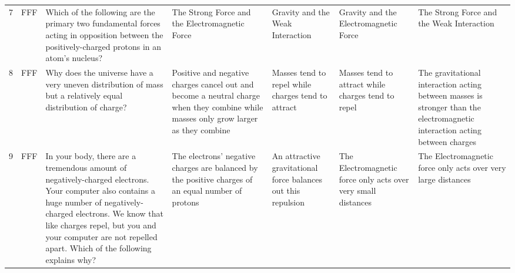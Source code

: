 \documentclass[10pt]{article}
\begin{document}
\begin{tiny}
\begin{longtable}{r P{0.3in} P{1.203in} P{0.8in} P{0.8in} P{0.8in} P{0.8in}}
    7     &     FFF &                                                                                                                                  Which of the following are the primary two fundamental forces acting in opposition between the positively-charged protons in an atom's nucleus? &                                                                                        The Strong Force and the Electromagnetic Force &                                                                      Gravity and the Weak Interaction &                                                                                      Gravity and the Electromagnetic Force &                                                                                         The Strong Force and the Weak Interaction \\
    8     &     FFF &                                                                                                                                                                     Why does the universe have a very uneven distribution of mass but a relatively equal distribution of charge? &  Positive and negative charges cancel out and become a neutral charge when they combine while masses only grow larger as they combine &                                                    Masses tend to repel while charges tend to attract &                                                                         Masses tend to attract while charges tend to repel &       The gravitational interaction acting between masses is stronger than the electromagnetic interaction acting between charges \\
    9     &     FFF &  In your body, there are a tremendous amount of negatively-charged electrons. Your computer also contains a huge number of negatively-charged electrons. We know that like charges repel, but you and your computer are not repelled apart. Which of the following explains why? &                                    The electrons' negative charges are balanced by the positive charges of an equal number of protons &                                         An attractive gravitational force balances out this repulsion &                                                              The Electromagnetic force only acts over very small distances &                                                                     The Electromagnetic force only acts over very large distances \\

\end{longtable}
\end{tiny}
\end{document}
